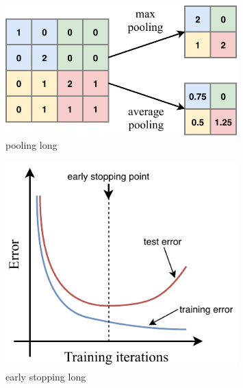 \begin{figure} %
    \includegraphics[width=0.8\textwidth]{diagrams/7-cvn/pooling.pdf}
    \caption[pooling short]
    {pooling long}
    \label{fig:pooling}
\end{figure} %


\begin{figure} %
    \includegraphics[width=0.8\textwidth]{diagrams/7-cvn/early_stopping.pdf}
    \caption[early stopping short]
    {early stopping long}
    \label{fig:early_stopping}
\end{figure} %


